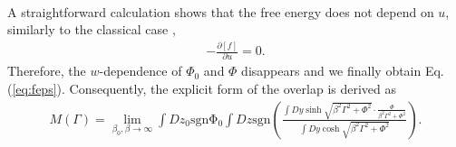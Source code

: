 \documentclass[aps,pra,twocolumn,groupedaddress,longbibliography]{revtex4}
\def\pd#1#2{\frac{\partial #1}{\partial #2}}
\begin{document}
\begin{widetext}
\begin{align}
\end{align}
A straightforward calculation shows that the free energy does not depend on $u$, similarly to the classical case \cite{Nishimura2016},
\begin{align}
	-\pd{[f]}{u} = 0.
\end{align}
Therefore, the $w$-dependence of $\Phi_0$ and $\Phi$ disappears and we finally obtain Eq. (\ref{eq:feps}).
Consequently, the explicit form of the overlap is derived as
\begin{align}
	M(\Gamma) = \lim_{\beta_0, \beta \to \infty}\int Dz_0 \mathrm{sgn \Phi_0}\int Dz \mathrm{sgn}\left(\frac{\int Dy \sinh \sqrt{\beta^2 \Gamma^2+\Phi^2}\cdot \frac{\Phi}{\beta^2 \Gamma^2 + \Phi^2}}{\int Dy \cosh \sqrt{\beta^2 \Gamma^2 + \Phi^2}}\right).
\end{align}
\end{widetext}





%

\end{document}
